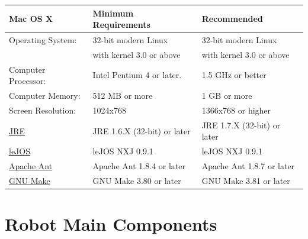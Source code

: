 \documentclass[11pt, a4paper]{report}
\begin{document}
\begin{tabular}{| l | l | l | }
\hline
Mac OS X				& Minimum Requirements									& Recommended				 			 	\\ \hline
Operating System:		& 32-bit modern Linux 									& 32-bit modern Linux 	 					\\ 
						& with kernel 3.0 or above								& with kernel 3.0 or above					\\ \hline
Computer Processor:		& Intel Pentium 4 or later.								& 1.5 GHz or better							\\ \hline
Computer Memory:		& 512 MB or more										& 1 GB or more								\\ \hline
Screen Resolution:		& 1024x768												& 1366x768 or higher						\\ \hline
\href{http://www.oracle.com/technetwork/java/javase/downloads/index.html}{JRE}
						& JRE 1.6.X (32-bit) or later							& JRE 1.7.X (32-bit) or later				\\ \hline
\href{http://lejos.sourceforge.net}{leJOS}
	 					& leJOS NXJ 0.9.1										& leJOS NXJ 0.9.1							\\ \hline
\href{http://ant.apache.org}{Apache Ant}
		 				& Apache Ant 1.8.4 or later 							& Apache Ant 1.8.7 or later 				\\ \hline
\href{http://www.gnu.org/software/make/}{GNU Make}   				
						& GNU Make 3.80 or later 								& GNU Make 3.81 or later 					\\ \hline
\end{tabular}




 
\chapter{Robot Main Components} %
\label{cha:robot_main_components}
\end{document}
